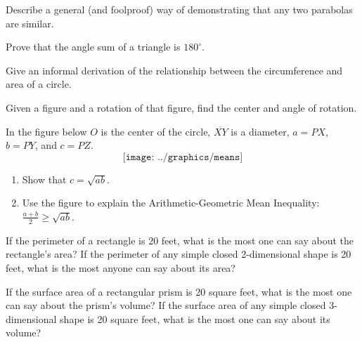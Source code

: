 \begin{prob}
Describe a general (and foolproof) way of demonstrating that any two parabolas are similar.
\end{prob}

\begin{prob}
Prove that the angle sum of a triangle is $180^\circ$.
\end{prob}

%
%
\begin{prob}
Give an informal derivation of the relationship between the circumference and area of a circle. 
\end{prob}

\begin{prob}
Given a figure and a rotation of that figure, find the center and angle of rotation.  
\end{prob}

\begin{prob}
In the figure below  $O$ is the center of the circle, $\overline{XY}$ is a diameter, $a = PX$, $b=PY$, and $c=PZ$.  
$$\texttt{[image: ../graphics/means]}$$
\begin{enumerate}
\item Show that $c=\sqrt{ab}$.  
\item Use the figure to explain the Arithmetic-Geometric Mean Inequality: $\frac{a+b}{2} \ge \sqrt{ab}$.  
\end{enumerate}
\end{prob}


\begin{prob}
If the perimeter of a rectangle is 20 feet, what is the most one can say about the rectangle's area?  If the perimeter of any simple closed 2-dimensional shape is 20 feet, what is the most anyone can say about its area?
\end{prob}

\begin{prob}
If the surface area of a rectangular prism is 20 square feet, what is the most one can say about the prism's volume?  If the surface area of any simple closed 3-dimensional shape is 20 square feet, what is the most one can say about its volume? 
\end{prob}


